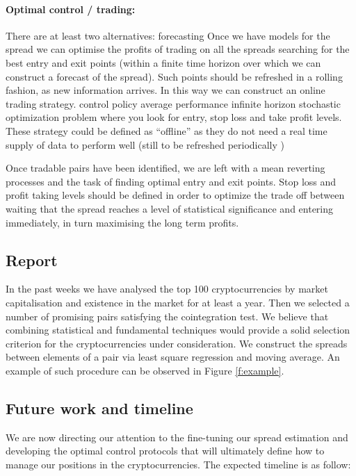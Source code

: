 \documentclass[a4paper,11pt]{article}
\theoremstyle{remark}
\theoremstyle{plain}
\newcommand\ab[1]{{\color{blue} #1 }}
\begin{document}
 
 \paragraph{Optimal control / trading:} There are at least two alternatives: \ab{forecasting} Once we have models for the spread we can optimise the profits of trading on all the spreads searching for the best entry and exit points (within a finite time horizon over which we can construct a forecast of the spread). Such points should be refreshed in a rolling fashion, as new information arrives. In this way we can construct an online trading strategy.
 \ab{control policy} average performance infinite horizon stochastic optimization problem where you look for entry, stop loss and take profit levels.
 These strategy could be defined as ``offline'' as they do not need a real time supply of data to perform well (still to be refreshed  periodically ) 
 
 Once tradable pairs have been identified, we are left with a mean reverting processes and the task of finding optimal entry and exit points. Stop loss and profit taking levels should be defined in order to optimize the trade off between waiting that the spread reaches a level of statistical significance and entering immediately, in turn maximising the long term profits.

\subsection{Report}
In the past weeks we have analysed the top 100 cryptocurrencies by market capitalisation and existence in the market for at least a year. Then we selected a number of promising pairs satisfying the cointegration test. We believe that combining statistical and fundamental techniques would provide a solid selection criterion for the cryptocurrencies under consideration. We construct the spreads between elements of a pair via least square regression and moving average. An example of such procedure can be observed in Figure \ref{f:example}.

\subsection{Future work and timeline}
We are now directing our attention to the fine-tuning our spread estimation and developing the optimal control protocols that will ultimately define how to manage our positions in the cryptocurrencies. The expected timeline is as follow:
\end{document}

